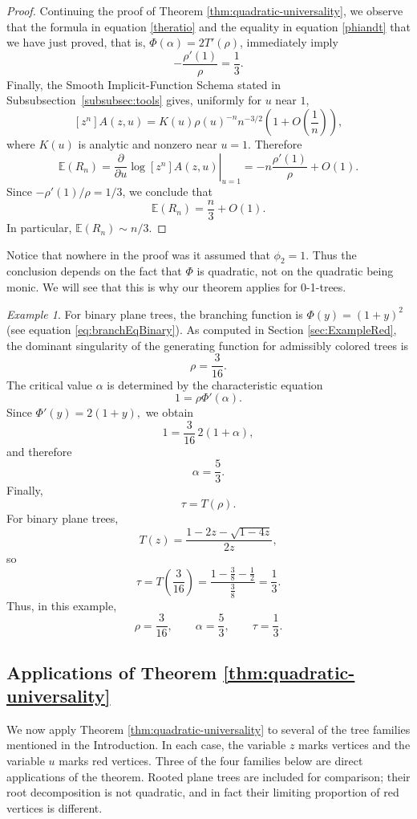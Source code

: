 \documentclass[10pt,a4paper]{amsart}
\theoremstyle{remark}
\newtheorem{example}[theorem]{Example}
\begin{document}
\begin{proof}
Continuing the proof of Theorem \ref{thm:quadratic-universality}, we observe that
the formula in equation \eqref{theratio} and the equality in equation \eqref{phiandt} that we have just proved, that is, $\Phi(\alpha)=2T'(\rho)$, immediately imply
\[
-\frac{\rho'(1)}{\rho}
=
\frac{1}{3}.
\]
Finally, the Smooth Implicit-Function Schema stated in Subsubsection~\ref{subsubsec:tools} gives, uniformly for
\(u\) near \(1\),
\[
[z^n]A(z,u)
=
K(u)\rho(u)^{-n}n^{-3/2}
\left(1+O\left(\frac{1}{n}\right)\right),
\]
where \(K(u)\) is analytic and nonzero near \(u=1\). Therefore
\[
\mathbb{E}(R_n)
=
\left.
\frac{\partial}{\partial u}
\log [z^n]A(z,u)
\right|_{u=1}
=
-n\frac{\rho'(1)}{\rho}+O(1).
\]
Since $-\rho'(1)/\rho=1/3$,
we conclude that
\[
\mathbb{E}(R_n)
=
\frac{n}{3}+O(1).
\]
In particular, $\mathbb{E}(R_n)\sim n/3$.
\end{proof}


Notice that nowhere in the proof was it assumed that
\(\phi_2=1\). Thus the conclusion depends on the fact that
\(\Phi\) is quadratic, not on the quadratic being monic.  We will see that this is why our theorem applies
for 0-1-trees. 



\begin{example}
For binary plane trees, the branching function is
$
\Phi(y)=(1+y)^2
$ 
(see equation \eqref{eq:branchEqBinary}).
As computed in Section \ref{sec:ExampleRed}, the dominant singularity of the generating function for admissibly colored trees is
\[
\rho=\frac{3}{16}.
\]
The critical value \(\alpha\) is determined by the characteristic equation
\[
1=\rho\Phi'(\alpha).
\]
Since
$
\Phi'(y)=2(1+y),
$
we obtain
\[
1=\frac{3}{16}\,2(1+\alpha),
\]
and therefore
\[
\alpha=\frac{5}{3}.
\]
Finally,
\[
\tau=T(\rho).
\]
For binary plane trees,
\[
T(z)=\frac{1-2z-\sqrt{1-4z}}{2z},
\]
so
\[
\tau=T\left(\frac{3}{16}\right)
=\frac{1-\frac{3}{8}-\frac12}{\frac{3}{8}}
=\frac13.
\]
Thus, in this example,
\[
{\rho=\frac{3}{16},\qquad \alpha=\frac53,\qquad \tau=\frac13.}
\]
\end{example}

\subsection{Applications of Theorem \ref{thm:quadratic-universality}}
\label{subsec:appIdeal}

We now apply Theorem \ref{thm:quadratic-universality} to several of the tree families mentioned in the Introduction. In each case, the variable $z$ marks vertices and the variable $u$ marks red vertices. Three of the four families below are direct applications of the theorem. Rooted plane trees are included for comparison; their root decomposition is not quadratic, and in fact their limiting proportion of red vertices is different.
\end{document}
